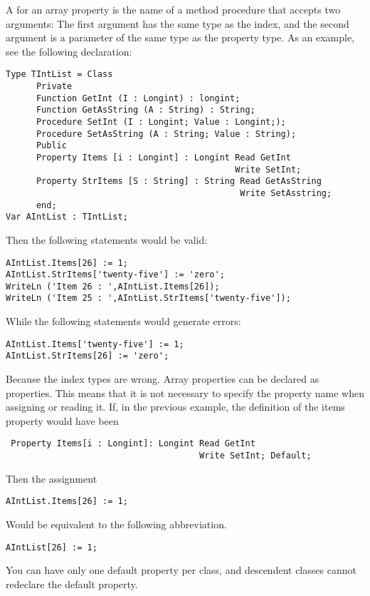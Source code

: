 \documentclass{report}
\begin{document}
A  for an array property is the name of a method
procedure that accepts two arguments: The first argument has the same
type as the index, and the second argument is a parameter of the same
type as the property type.
As an example, see the following declaration:
\begin{verbatim}
Type TIntList = Class
      Private
      Function GetInt (I : Longint) : longint;
      Function GetAsString (A : String) : String;
      Procedure SetInt (I : Longint; Value : Longint;);
      Procedure SetAsString (A : String; Value : String);
      Public
      Property Items [i : Longint] : Longint Read GetInt
                                             Write SetInt;
      Property StrItems [S : String] : String Read GetAsString
                                              Write SetAsstring;
      end;
Var AIntList : TIntList;
\end{verbatim}
Then the following statements would be valid:
\begin{verbatim}
AIntList.Items[26] := 1;
AIntList.StrItems['twenty-five'] := 'zero';
WriteLn ('Item 26 : ',AIntList.Items[26]);
WriteLn ('Item 25 : ',AIntList.StrItems['twenty-five']);
\end{verbatim}
While the following statements would generate errors:
\begin{verbatim}
AIntList.Items['twenty-five'] := 1;
AIntList.StrItems[26] := 'zero';
\end{verbatim}
Because the index types are wrong.
Array properties can be declared as  properties. This means that
it is not necessary to specify the property name when assigning or reading
it. If, in the previous example, the definition of the items property would
have been
\begin{verbatim}
 Property Items[i : Longint]: Longint Read GetInt
                                      Write SetInt; Default;
\end{verbatim}
Then the assignment
\begin{verbatim}
AIntList.Items[26] := 1;
\end{verbatim}
Would be equivalent to the following abbreviation.
\begin{verbatim}
AIntList[26] := 1;
\end{verbatim}
You can have only one default property per class, and descendent classes
cannot redeclare the default property.


\end{document}

